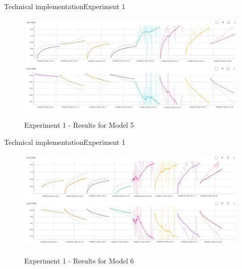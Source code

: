 \documentclass[
]{beamer}
\begin{document}
\begin{frame}{Technical implementation}{Experiment 1}

\begin{center}
    \begin{figure}[!h]
        \centering
        \includegraphics[width=\textwidth]{img/exp1_acc5+loss5.jpg}
        \label{fig:exp1_mod5}
        \caption{Experiment 1 - Results for Model 5}
    \end{figure}
\end{center}

\end{frame}


\begin{frame}{Technical implementation}{Experiment 1}

\begin{center}
    \begin{figure}[!h]
        \centering
        \includegraphics[width=\textwidth]{img/exp1_acc6+loss6.jpg}
        \label{fig:exp1_mod6}
        \caption{Experiment 1 - Results for Model 6}
    \end{figure}
\end{center}

\end{frame}
\end{document}
